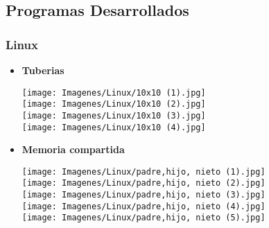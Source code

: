 \documentclass[12pt]{article}
\begin{document}
\subsection{Programas Desarrollados}
    \subsubsection{Linux}
        \begin{itemize}
            \item \textbf{Tuberias}
            \begin{center}
                \texttt{[image: Imagenes/Linux/10x10 (1).jpg]}\\
                 \texttt{[image: Imagenes/Linux/10x10 (2).jpg]}\\
                  \texttt{[image: Imagenes/Linux/10x10 (3).jpg]}\\
                   \texttt{[image: Imagenes/Linux/10x10 (4).jpg]}\\
            \end{center}
            \item \textbf{Memoria compartida}\\
            \begin{center}
                \texttt{[image: Imagenes/Linux/padre,hijo, nieto (1).jpg]}\\
                \texttt{[image: Imagenes/Linux/padre,hijo, nieto (2).jpg]}\\
                \texttt{[image: Imagenes/Linux/padre,hijo, nieto (3).jpg]}\\
                \texttt{[image: Imagenes/Linux/padre,hijo, nieto (4).jpg]}\\
                \texttt{[image: Imagenes/Linux/padre,hijo, nieto (5).jpg]}\\
            \end{center}
        \end{itemize}
\end{document}
